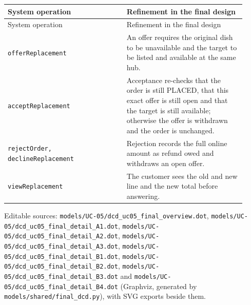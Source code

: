 \begin{longtable}{>{\raggedright\arraybackslash}p{0.4600\linewidth}>{\raggedright\arraybackslash}p{0.4600\linewidth}}
System operation & Refinement in the final design \\
\hline\endfirsthead
System operation & Refinement in the final design \\
\hline\endhead
\texttt{offerReplacement} & An offer requires the original dish to be unavailable and the target to be listed and available at the same hub. \\
\texttt{acceptReplacement} & Acceptance re-checks that the order is still PLACED, that this exact offer is still open and that the target is still available; otherwise the offer is withdrawn and the order is unchanged. \\
\texttt{rejectOrder, declineReplacement} & Rejection records the full online amount as refund owed and withdraws an open offer. \\
\texttt{viewReplacement} & The customer sees the old and new line and the new total before answering. \\
\end{longtable}
Editable sources: \texttt{models/\allowbreak{}UC-05/\allowbreak{}dcd\_\allowbreak{}uc05\_\allowbreak{}final\_\allowbreak{}overview.\allowbreak{}dot}, \texttt{models/\allowbreak{}UC-05/\allowbreak{}dcd\_\allowbreak{}uc05\_\allowbreak{}final\_\allowbreak{}detail\_\allowbreak{}A1.\allowbreak{}dot}, \texttt{models/\allowbreak{}UC-05/\allowbreak{}dcd\_\allowbreak{}uc05\_\allowbreak{}final\_\allowbreak{}detail\_\allowbreak{}A2.\allowbreak{}dot}, \texttt{models/\allowbreak{}UC-05/\allowbreak{}dcd\_\allowbreak{}uc05\_\allowbreak{}final\_\allowbreak{}detail\_\allowbreak{}A3.\allowbreak{}dot}, \texttt{models/\allowbreak{}UC-05/\allowbreak{}dcd\_\allowbreak{}uc05\_\allowbreak{}final\_\allowbreak{}detail\_\allowbreak{}B1.\allowbreak{}dot}, \texttt{models/\allowbreak{}UC-05/\allowbreak{}dcd\_\allowbreak{}uc05\_\allowbreak{}final\_\allowbreak{}detail\_\allowbreak{}B2.\allowbreak{}dot}, \texttt{models/\allowbreak{}UC-05/\allowbreak{}dcd\_\allowbreak{}uc05\_\allowbreak{}final\_\allowbreak{}detail\_\allowbreak{}B3.\allowbreak{}dot} and \texttt{models/\allowbreak{}UC-05/\allowbreak{}dcd\_\allowbreak{}uc05\_\allowbreak{}final\_\allowbreak{}detail\_\allowbreak{}B4.\allowbreak{}dot} (Graphviz, generated by \texttt{models/\allowbreak{}shared/\allowbreak{}final\_\allowbreak{}dcd.\allowbreak{}py}), with SVG exports beside them.
